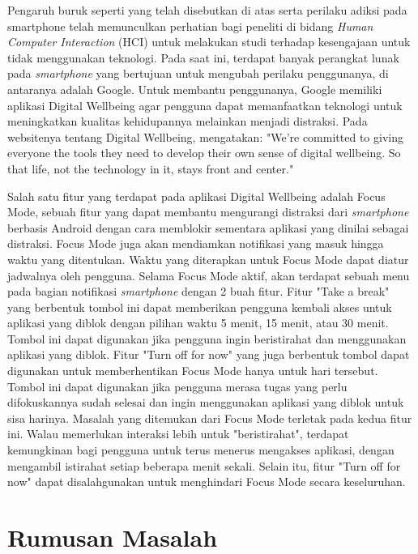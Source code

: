 Pengaruh buruk seperti yang telah disebutkan di atas serta perilaku adiksi pada smartphone telah memunculkan perhatian bagi peneliti di bidang \textit{Human Computer Interaction} (HCI) untuk melakukan studi terhadap kesengajaan untuk tidak menggunakan teknologi. Pada saat ini, terdapat banyak perangkat lunak pada \textit{smartphone} yang bertujuan untuk mengubah perilaku penggunanya, di antaranya adalah Google. \parencite{Roffarello2019} Untuk membantu penggunanya, Google memiliki aplikasi Digital Wellbeing agar pengguna dapat memanfaatkan teknologi untuk meningkatkan kualitas kehidupannya melainkan menjadi distraksi. Pada websitenya tentang Digital Wellbeing, \textcite{google2019digitalwellbeing} mengatakan: "We’re committed to giving everyone the tools they need to develop their own sense of digital wellbeing. So that life, not the technology in it, stays front and center." 


Salah satu fitur yang terdapat pada aplikasi Digital Wellbeing adalah Focus Mode, sebuah fitur yang dapat membantu mengurangi distraksi dari \emph{smartphone} berbasis Android dengan cara memblokir sementara aplikasi yang dinilai sebagai distraksi. Focus Mode juga akan mendiamkan notifikasi yang masuk hingga waktu yang ditentukan. Waktu yang diterapkan untuk Focus Mode dapat diatur jadwalnya oleh pengguna. \parencite{android2019digitalwellbeing} Selama Focus Mode aktif, akan terdapat sebuah menu pada bagian notifikasi \emph{smartphone} dengan 2 buah fitur. Fitur "Take a break" yang berbentuk tombol ini dapat memberikan pengguna kembali akses untuk aplikasi yang diblok dengan pilihan waktu 5 menit, 15 menit, atau 30 menit. Tombol ini dapat digunakan jika pengguna ingin beristirahat dan menggunakan aplikasi yang diblok. Fitur "Turn off for now" yang juga berbentuk tombol dapat digunakan untuk memberhentikan Focus Mode hanya untuk hari tersebut. Tombol ini dapat digunakan jika pengguna merasa tugas yang perlu difokuskannya sudah selesai dan ingin menggunakan aplikasi yang diblok untuk sisa harinya. Masalah yang ditemukan dari Focus Mode terletak pada kedua fitur ini. Walau memerlukan interaksi lebih untuk "beristirahat", terdapat kemungkinan bagi pengguna untuk terus menerus mengakses aplikasi, dengan mengambil istirahat setiap beberapa menit sekali. Selain itu, fitur "Turn off for now" dapat disalahgunakan untuk menghindari Focus Mode secara keseluruhan.

\section{Rumusan Masalah}

